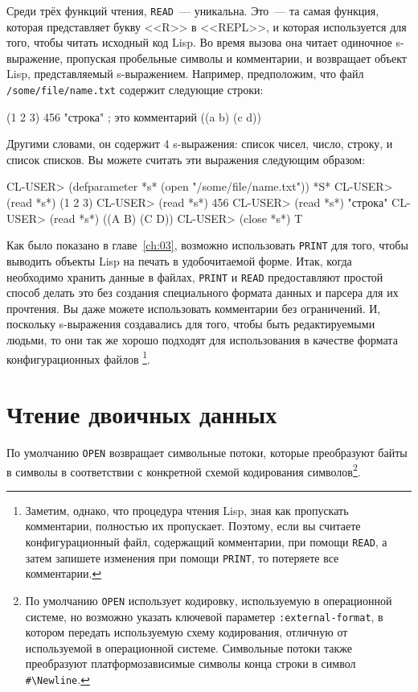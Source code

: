 Среди трёх функций чтения, \lstinline{READ}~--- уникальна. Это~--- та самая функция, которая
представляет букву <<R>> в <<REPL>>, и которая используется для того, чтобы читать исходный
код Lisp. Во время вызова она читает одиночное s-выражение, пропуская пробельные символы и
комментарии, и возвращает объект Lisp, представляемый s-выражением. Например, предположим,
что файл \lstinline{/some/file/name.txt} содержит следующие строки:

\begin{myverb}
(1 2 3)
456
"строка" ; это комментарий
((a b)
 (c d))
\end{myverb}

Другими словами, он содержит 4 s-выражения: список чисел, число, строку, и список
списков. Вы можете считать эти выражения следующим образом:

\begin{myverb}
CL-USER> (defparameter *s* (open "/some/file/name.txt"))
*S*
CL-USER> (read *s*)
(1 2 3)
CL-USER> (read *s*)
456
CL-USER> (read *s*)
"строка"
CL-USER> (read *s*)
((A B) (C D))
CL-USER> (close *s*)
T
\end{myverb}

Как было показано в главе~\ref{ch:03}, возможно использовать \lstinline{PRINT} для того, чтобы выводить
объекты Lisp на печать в удобочитаемой форме. Итак, когда необходимо хранить данные в
файлах, \lstinline{PRINT} и \lstinline{READ} предоставляют простой способ делать это без создания
специального формата данных и парсера для их прочтения. Вы даже можете использовать
комментарии без ограничений. И, поскольку s-выражения создавались для того, чтобы быть
редактируемыми людьми, то они так же хорошо подходят для использования в качестве формата
конфигурационных файлов \footnote{Заметим, однако, что процедура чтения Lisp, зная как
  пропускать комментарии, полностью их пропускает. Поэтому, если вы считаете
  конфигурационный файл, содержащий комментарии, при помощи \lstinline{READ}, а затем запишете
  изменения при помощи \lstinline{PRINT}, то потеряете все комментарии.}\hspace{\footnotenegspace}.

\section{Чтение двоичных данных}

По умолчанию \lstinline{OPEN} возвращает символьные потоки, которые преобразуют байты в символы
в соответствии с конкретной схемой кодирования символов\footnote{По умолчанию \lstinline{OPEN}
  использует кодировку, используемую в операционной системе, но возможно указать ключевой
  параметер \lstinline{:external-format}, в котором передать используемую схему кодирования,
  отличную от используемой в операционной системе. Символьные потоки также преобразуют
  платформозависимые символы конца строки в символ \lstinline!#\Newline!.}\hspace{\footnotenegspace}.

